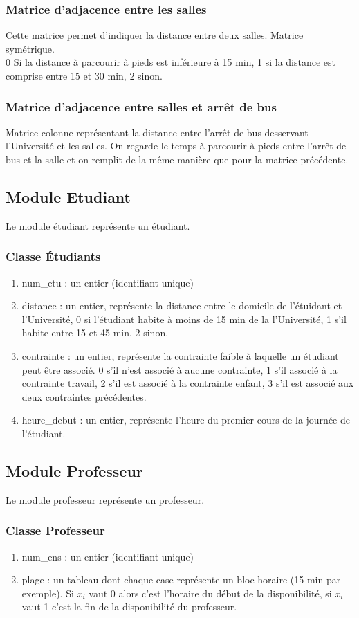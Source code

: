 \documentclass[a4paper,11pt]{article}
\begin{document}
		\subsubsection{Matrice d'adjacence entre les salles}
			Cette matrice permet d'indiquer la distance entre deux salles. Matrice symétrique.\\ 0 Si la distance à parcourir à pieds est inférieure à 15 min, 1 si la distance est comprise entre 15 et 30 min, 2 sinon.
		\subsubsection{Matrice d'adjacence entre salles et arrêt de bus}
			Matrice colonne représentant la distance entre l'arrêt de bus desservant l'Université et les salles. On regarde le temps à parcourir à pieds entre l'arrêt de bus et la salle et on remplit de la même manière que pour la matrice précédente.
	\subsection{Module Etudiant}
		Le module étudiant représente un étudiant.
		\subsubsection{Classe Étudiants}
		\begin{enumerate}
			\item num\_etu : un entier (identifiant unique)
			\item distance : un entier, représente la distance entre le domicile de l'étuidant et l'Université, 0 si l'étudiant habite à moins de 15 min de la l'Université, 1 s'il habite entre 15 et 45 min, 2 sinon.
			\item contrainte : un entier, représente la contrainte faible à laquelle un étudiant peut être associé. 0 s'il n'est associé à aucune contrainte, 1 s'il associé à la contrainte travail, 2 s'il est associé à la contrainte enfant, 3 s'il est associé aux deux contraintes précédentes. 
			\item heure\_debut : un entier, représente l'heure du premier cours de la journée de l'étudiant.
			\end{enumerate}
	\subsection{Module Professeur}
		Le module professeur représente un professeur.
		\subsubsection{Classe Professeur}
		\begin{enumerate}
			\item num\_ens : un entier (identifiant unique)
			\item plage : un tableau dont chaque case représente un bloc horaire (15 min par exemple). Si $x_i$ vaut 0 alors c'est l'horaire du début de la disponibilité, si $x_i$ vaut 1 c'est la fin de la disponibilité du professeur.
			\end{enumerate}
\end{document}

